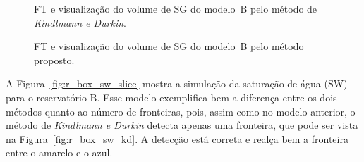 \begin{figure}[h]
	\centering
	\caption{FT e visualização do volume de SG do modelo~B pelo método de \textit{Kindlmann e Durkin}.}
	\label{fig:r_box_sg_kd}
\end{figure}

\begin{figure}[h]
	\centering
	\caption{FT e visualização do volume de SG do modelo~B pelo método proposto.}
	\label{fig:r_box_sg_mine}
\end{figure}

\clearpage
	A Figura~\ref{fig:r_box_sw_slice} mostra a simulação da saturação de água (SW) para o reservatório B. Esse modelo exemplifica bem a diferença entre os dois métodos quanto ao número de fronteiras, pois, assim como no modelo anterior, o método de \textit{Kindlmann e Durkin} detecta apenas uma fronteira, que pode ser vista na Figura~\ref{fig:r_box_sw_kd}. A detecção está correta e realça bem a fronteira entre o amarelo e o azul.
	

